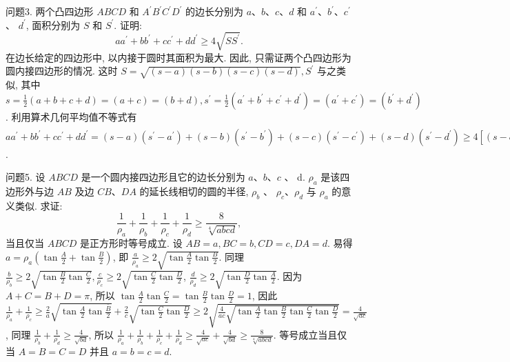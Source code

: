 问题3. 两个凸四边形 $A B C D$ 和 $A^{\prime} B^{\prime} C^{\prime} D^{\prime}$ 的边长分别为 $a 、 b 、 c 、 d$ 和 $a^{\prime} 、 b^{\prime} 、 c^{\prime}$ 、 $d^{\prime}$, 面积分别为 $S$ 和 $S^{\prime}$. 证明:
$$
a a^{\prime}+b b^{\prime}+c c^{\prime}+d d^{\prime} \geqslant 4 \sqrt{S S^{\prime}} .
$$
在边长给定的四边形中, 以内接于圆时其面积为最大.
因此, 只需证两个凸四边形为圆内接四边形的情况.
这时 $S= \sqrt{(s-a)(s-b)(s-c)(s-d)}, S^{\prime}$ 与之类似, 其中 $s=\frac{1}{2}(a+b+c+d)= (a+c)=(b+d), s^{\prime}=\frac{1}{2}\left(a^{\prime}+b^{\prime}+c^{\prime}+d^{\prime}\right)=\left(a^{\prime}+c^{\prime}\right)=\left(b^{\prime}+d^{\prime}\right)$. 利用算术几何平均值不等式有 $a a^{\prime}+b b^{\prime}+c c^{\prime}+d d^{\prime}=(s-a)\left(s^{\prime}-a^{\prime}\right)+(s-b) \left(s^{\prime}-b^{\prime}\right)+(s-c)\left(s^{\prime}-c^{\prime}\right)+(s-d)\left(s^{\prime}-d^{\prime}\right) \geqslant 4\left[(s-a)\left(s^{\prime}-a^{\prime}\right)(s-b)\right. \left.\left(s^{\prime}-b^{\prime}\right)(s-c)\left(s^{\prime}-c^{\prime}\right)(s-d)\left(s^{\prime}-d^{\prime}\right)\right]^{\frac{1}{4}}=4 \sqrt{S S^{\prime}}$.



问题5. 设 $A B C D$ 是一个圆内接四边形且它的边长分别为 $a 、 b 、 c$ 、 d. $\rho_a$ 是该四边形外与边 $A B$ 及边 $C B 、 D A$ 的延长线相切的圆的半径, $\rho_b$ 、 $\rho_c 、 \rho_d$ 与 $\rho_a$ 的意义类似.
求证:
$$
\frac{1}{\rho_a}+\frac{1}{\rho_b}+\frac{1}{\rho_c}+\frac{1}{\rho_d} \geqslant \frac{8}{\sqrt[4]{a b c d}},
$$
当且仅当 $A B C D$ 是正方形时等号成立.
设 $A B=a, B C=b, C D=c, D A=d$. 易得 $a=\rho_a\left(\tan \frac{A}{2}+\tan \frac{B}{2}\right)$, 即 $\frac{a}{\rho_a} \geqslant 2 \sqrt{\tan \frac{A}{2} \tan \frac{B}{2}}$. 同理 $\frac{b}{\rho_b} \geqslant 2 \sqrt{\tan \frac{B}{2} \tan \frac{C}{2}}, \frac{c}{\rho_c} \geqslant 2 \sqrt{\tan \frac{C}{2} \tan \frac{D}{2}}$, $\frac{d}{\rho_d} \geqslant 2 \sqrt{\tan \frac{D}{2} \tan \frac{A}{2}}$. 因为 $A+C=B+D=\pi$, 所以 $\tan \frac{A}{2} \tan \frac{C}{2}=\tan \frac{B}{2} \tan \frac{D}{2}=1$, 因此 $\frac{1}{\rho_a}+\frac{1}{\rho_c} \geqslant \frac{2}{a} \sqrt{\tan \frac{A}{2} \tan \frac{\bar{B}}{2}}+\frac{2}{c} \sqrt{\tan \frac{C}{2} \tan \frac{D}{2}} \geqslant 2 \sqrt{\frac{4}{a c} \sqrt{\tan \frac{A}{2} \tan \frac{B}{2} \tan \frac{C}{2} \tan \frac{D}{2}}}=\frac{4}{\sqrt{a c}}$, 同理 $\frac{1}{\rho_b}+\frac{1}{\rho_d} \geqslant \frac{4}{\sqrt{b d}}$, 所以 $\frac{1}{\rho_a}+ \frac{1}{\rho_b}+\frac{1}{\rho_c}+\frac{1}{\rho_d} \geqslant \frac{4}{\sqrt{a c}}+\frac{4}{\sqrt{b d}} \geqslant \frac{8}{\sqrt[4]{a b c d}}$. 等号成立当且仅当 $A=B=C= D$ 并且 $a=b=c=d$.


